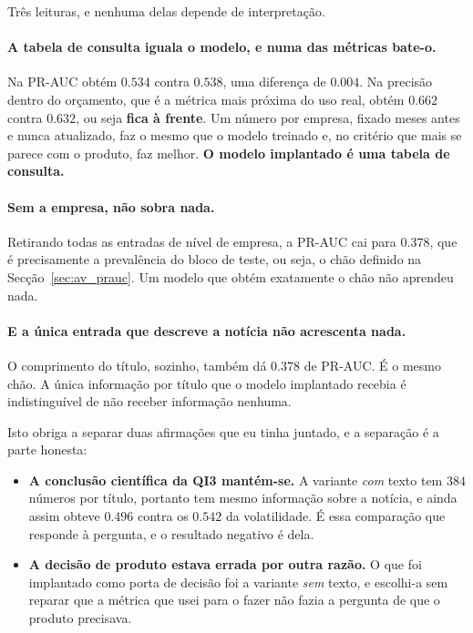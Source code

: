 Três leituras, e nenhuma delas depende de interpretação.

\paragraph{A tabela de consulta iguala o modelo, e numa das métricas bate-o.}
Na PR-AUC obtém $0.534$ contra $0.538$, uma diferença de $0.004$. Na precisão dentro do orçamento,
que é a métrica mais próxima do uso real, obtém $0.662$ contra $0.632$, ou seja \textbf{fica à
frente}. Um número por empresa, fixado meses antes e nunca atualizado, faz o mesmo que o modelo
treinado e, no critério que mais se parece com o produto, faz melhor.
\textbf{O modelo implantado é uma tabela de consulta.}

\paragraph{Sem a empresa, não sobra nada.}
Retirando todas as entradas de nível de empresa, a PR-AUC cai para $0.378$, que é precisamente a
prevalência do bloco de teste, ou seja, o chão definido na Secção~\ref{sec:av_prauc}. Um modelo que
obtém exatamente o chão não aprendeu nada.

\paragraph{E a única entrada que descreve a notícia não acrescenta nada.}
O comprimento do título, sozinho, também dá $0.378$ de PR-AUC. É o mesmo chão. A única informação
por título que o modelo implantado recebia é indistinguível de não receber informação nenhuma.

Isto obriga a separar duas afirmações que eu tinha juntado, e a separação é a parte honesta:

\begin{itemize}
  \item \textbf{A conclusão científica da \gls{QI}3 mantém-se.} A variante \emph{com} texto tem
        $384$ números por título, portanto tem mesmo informação sobre a notícia, e ainda assim
        obteve $0.496$ contra os $0.542$ da volatilidade. É essa comparação que responde à
        pergunta, e o resultado negativo é dela.
  \item \textbf{A decisão de produto estava errada por outra razão.} O que foi implantado como
        porta de decisão foi a variante \emph{sem} texto, e escolhi-a sem reparar que a métrica
        que usei para o fazer não fazia a pergunta de que o produto precisava.
\end{itemize}

